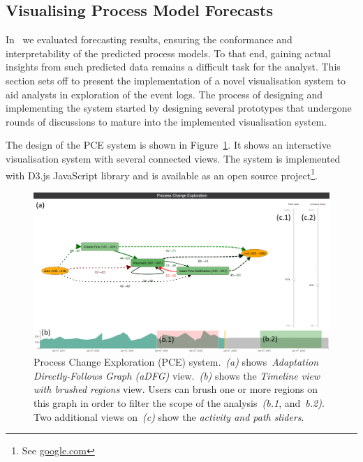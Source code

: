 \subsection{Visualising Process Model Forecasts}\label{sec:visualisation}

In~ we evaluated forecasting results, ensuring the conformance and interpretability of the predicted process models. To that end, gaining actual insights from such predicted data remains a difficult task for the analyst. This section sets off to present the implementation of a novel visualisation system to aid analysts in exploration of the event logs. The process of designing and implementing the system started by designing several prototypes that undergone rounds of discussions to mature into the implemented visualisation system. 

The design of the PCE system is shown in Figure~\ref{fig:vis-two-brushes}. It shows an interactive visualisation system with several connected views. The system is implemented with D3.js JavaScript library and is available as an open source project\footnote{See \url{google.com}}.

\begin{figure}
	\centering
	\includegraphics[width=\textwidth]{img/vis/actual-predicted-two-brushed-regions-system.PNG}
	\caption{Process Change Exploration (PCE) system.~\emph{(a)} shows~\emph{Adaptation Directly-Follows Graph (aDFG)} view.~\emph{(b)} shows the \emph{Timeline view with brushed regions} view. Users can brush one or more regions on this graph in order to filter the scope of the analysis~\emph{(b.1}, and~\emph{b.2)}. Two additional views on~\emph{(c)} show the \emph{activity and path sliders}.} 
	\label{fig:vis-two-brushes}
\end{figure}